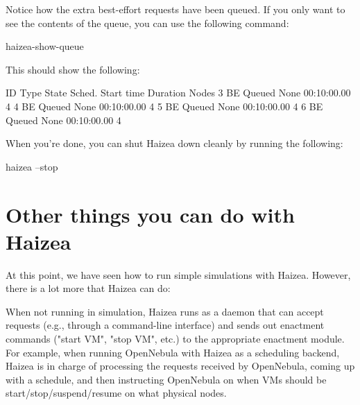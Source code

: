 Notice how the extra best-effort requests have been queued. If you only want to see the contents of the queue, you can use the following command:

\begin{shellverbatim}
haizea-show-queue
\end{shellverbatim}

This should show the following:

\begin{wideshellverbatim}
 ID   Type  State      Sched. Start time       Duration      Nodes  
 3    BE    Queued     None                    00:10:00.00   4       
 4    BE    Queued     None                    00:10:00.00   4       
 5    BE    Queued     None                    00:10:00.00   4       
 6    BE    Queued     None                    00:10:00.00   4       
\end{wideshellverbatim}

When you're done, you can shut Haizea down cleanly by running the following:

\begin{shellverbatim}
haizea --stop
\end{shellverbatim}


\section{Other things you can do with Haizea}

At this point, we have seen how to run simple simulations with Haizea. However, there is a lot more that Haizea can do:

When not running in simulation, Haizea runs as a daemon that can accept requests (e.g., through a command-line interface) and sends out enactment commands ("start VM", "stop VM", etc.) to the appropriate enactment module. For example, when running OpenNebula with Haizea as a scheduling backend, Haizea is in charge of processing the requests received by OpenNebula, coming up with a schedule, and then instructing OpenNebula on when VMs should be start/stop/suspend/resume on what physical nodes.

